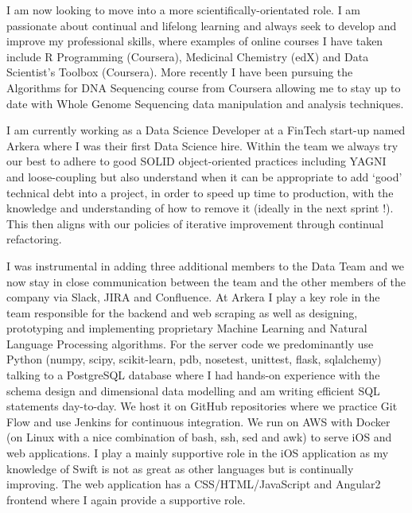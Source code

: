 \documentclass[11pt,a4paper,sans]{moderncv}        %
\begin{document}
I am now looking to move into a more scientifically-orientated role. I am passionate about continual and lifelong learning and always seek to develop and improve my professional skills, where examples of online courses I have taken include R Programming (Coursera), Medicinal Chemistry (edX) and Data Scientist's Toolbox (Coursera). More recently I have been pursuing the 
Algorithms for DNA Sequencing course from Coursera allowing me to stay up to date
with Whole Genome Sequencing data manipulation and analysis techniques.

I am currently working as a Data Science Developer at a FinTech start-up named Arkera where I was their first Data Science hire. Within the team we always try our best to adhere to good SOLID object-oriented practices including YAGNI and loose-coupling but also understand when it can be appropriate to add `good' technical debt into a project, in order to speed up time to production, with the knowledge and understanding of how to remove it (ideally in the next sprint !). This then aligns with our policies of iterative improvement through continual refactoring.

I was instrumental in adding three additional members to the Data Team and we now stay in close communication between the team and the other members of the company via Slack, JIRA and Confluence. At Arkera I play a key role in the team responsible for the backend and web scraping as well as designing, prototyping and implementing proprietary Machine Learning and Natural Language Processing algorithms. For the server code we predominantly use Python (numpy, scipy, scikit-learn, pdb, nosetest, unittest, flask, sqlalchemy) talking to a PostgreSQL database where I had hands-on experience with the schema design and dimensional data modelling and am writing efficient SQL statements day-to-day. We host it on GitHub repositories where we practice Git Flow and use Jenkins for continuous integration. We run on AWS with Docker (on Linux with a nice combination of bash, ssh, sed and awk) to serve iOS and web applications. I play a mainly supportive role in the iOS application as my knowledge of Swift is not as great as other languages but is continually improving. The web application has a CSS/HTML/JavaScript and Angular2 frontend where I again provide a supportive role. 
\end{document}
